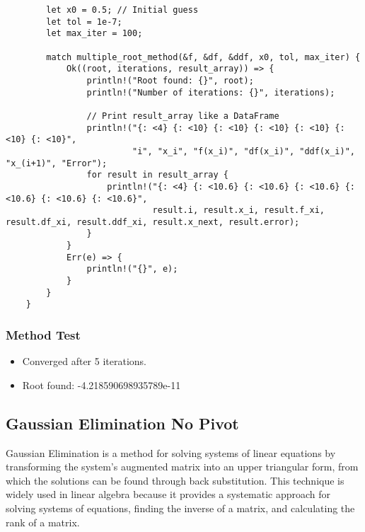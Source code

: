 \documentclass{article}
\begin{document}
\begin{verbatim}
        let x0 = 0.5; // Initial guess
        let tol = 1e-7;
        let max_iter = 100;

        match multiple_root_method(&f, &df, &ddf, x0, tol, max_iter) {
            Ok((root, iterations, result_array)) => {
                println!("Root found: {}", root);
                println!("Number of iterations: {}", iterations);

                // Print result_array like a DataFrame
                println!("{: <4} {: <10} {: <10} {: <10} {: <10} {: <10} {: <10}",
                         "i", "x_i", "f(x_i)", "df(x_i)", "ddf(x_i)", "x_(i+1)", "Error");
                for result in result_array {
                    println!("{: <4} {: <10.6} {: <10.6} {: <10.6} {: <10.6} {: <10.6} {: <10.6}",
                             result.i, result.x_i, result.f_xi, result.df_xi, result.ddf_xi, result.x_next, result.error);
                }
            }
            Err(e) => {
                println!("{}", e);
            }
        }
    }
                \end{verbatim}
        \subsubsection{Method Test}
            \begin{itemize}
                \item Converged after 5 iterations.
                \item Root found: -4.218590698935789e-11
            \end{itemize}


    \subsection{Gaussian Elimination No Pivot}
        Gaussian Elimination is a method for solving systems of linear equations by transforming the system's augmented
        matrix into an upper triangular form, from which the solutions can be found through back substitution. This
        technique is widely used in linear algebra because it provides a systematic approach for solving systems of
        equations, finding the inverse of a matrix, and calculating the rank of a matrix.
\end{document}
